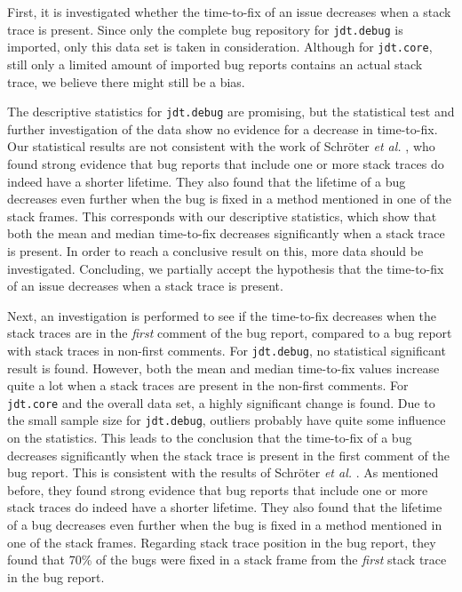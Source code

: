 First, it is investigated whether the time-to-fix of an issue decreases when a stack trace is present. Since only the complete bug repository for \texttt{jdt.debug} is imported, only this data set is taken in consideration. Although for \texttt{jdt.core}, still only a limited amount of imported bug reports contains an actual stack trace, we believe there might still be a bias. 

The descriptive statistics for \texttt{jdt.debug} are promising, but the statistical test and further investigation of the data show no evidence for a decrease in time-to-fix. Our statistical results are not consistent with the work of Schr\"{o}ter \emph{et al.} \cite{Schroter2010}, who found strong evidence that bug reports that include one or more stack traces do indeed have a shorter lifetime. They also found that the lifetime of a bug decreases even further when the bug is fixed in a method mentioned in one of the stack frames. This corresponds with our descriptive statistics, which show that both the mean and median time-to-fix decreases significantly when a stack trace is present. In order to reach a conclusive result on this, more data should be investigated. Concluding, we partially accept the hypothesis that the time-to-fix of an issue decreases when a stack trace is present.

Next, an investigation is performed to see if the time-to-fix decreases when the stack traces are in the \emph{first} comment of the bug report, compared to a bug report with stack traces in non-first comments. For \texttt{jdt.debug}, no statistical significant result is found. However, both the mean and median time-to-fix values increase quite a lot when a stack traces are present in the non-first comments. For \texttt{jdt.core} and the overall data set, a highly significant change is found. Due to the small sample size for \texttt{jdt.debug}, outliers probably have quite some influence on the statistics. This leads to the conclusion that the time-to-fix of a bug decreases significantly when the stack trace is present in the first comment of the bug report. This is consistent with the results of Schr\"{o}ter \emph{et al.} \cite{Schroter2010}. As mentioned before, they found strong evidence that bug reports that include one or more stack traces do indeed have a shorter lifetime. They also found that the lifetime of a bug decreases even further when the bug is fixed in a method mentioned in one of the stack frames. Regarding stack trace position in the bug report, they found that 70\% of the bugs were fixed in a stack frame from the \emph{first} stack trace in the bug report.

